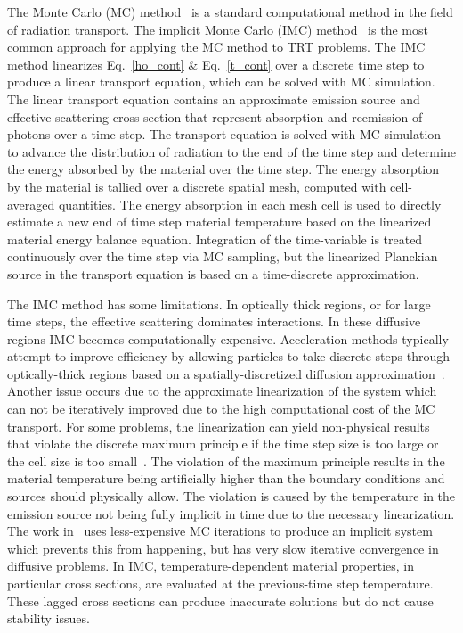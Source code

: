 \documentclass[11pt]{article}
\begin{document}
The Monte Carlo (MC) method~\cite{shultis_mc} is a standard computational method in
the field of radiation transport.
 The implicit Monte Carlo (IMC) method~\cite{fnc}
is the most common approach for applying the MC method to TRT problems. The IMC
method linearizes Eq.~\eqref{ho_cont} \& Eq.~\eqref{t_cont} over a discrete time
step to produce a linear transport equation, which can be solved with MC
simulation.  The linear transport equation contains an approximate emission source
and effective scattering cross section that represent
absorption and reemission of photons over a time step.  The transport equation is
solved with MC simulation 
to advance the distribution of radiation to the end of the time step and determine
the energy absorbed by the material over the time step.  The energy absorption by
the material is tallied over a discrete spatial mesh, computed with cell-averaged
quantities.
  The energy absorption in each mesh cell is used to directly estimate
a new end of time step material temperature based on the linearized material
energy balance equation. Integration of the
time-variable is treated continuously over the time step via MC sampling, but the
linearized Planckian source in the transport equation is based on a time-discrete
approximation.
  

The IMC method has some limitations.  In optically thick regions, or for
large time steps, the
effective scattering dominates interactions.  In these diffusive regions IMC
becomes computationally expensive. Acceleration methods typically attempt to improve
efficiency by allowing particles to take discrete steps through optically-thick
regions based on a spatially-discretized diffusion approximation~\cite{imd,ddmc}. 
Another issue occurs due to the approximate linearization of the system which can not
be iteratively improved due
to the high computational cost of the MC transport.  For some problems, the
linearization can yield non-physical results that violate the discrete maximum
principle if the time step size is too large or the cell size is too
small~\cite{wollaber2013discrete}.  The violation of the maximum principle results in
the material temperature being artificially higher than the boundary conditions and
sources should physically allow.  The violation is caused by the temperature in the
emission source not being fully implicit in time due to the necessary linearization.
The work in~\cite{iimc_gentile} uses less-expensive MC iterations to produce an implicit system
which prevents this from happening, but has very slow iterative convergence in diffusive
problems.  
In IMC, temperature-dependent
material properties, in particular cross sections, are evaluated at the previous-time
step temperature. These lagged cross sections can produce inaccurate solutions but
do not cause stability issues.  
\end{document}
